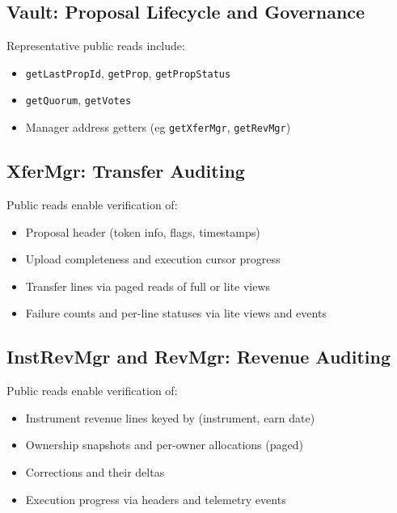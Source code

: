 \documentclass[10pt]{article}
\begin{document}
\subsection{Vault: Proposal Lifecycle and Governance}
Representative public reads include:

\begin{itemize}
    \item \texttt{getLastPropId}, \texttt{getProp}, \texttt{getPropStatus}
    \item \texttt{getQuorum}, \texttt{getVotes}
    \item Manager address getters (eg \texttt{getXferMgr}, \texttt{getRevMgr})
\end{itemize}

\subsection{XferMgr: Transfer Auditing}
Public reads enable verification of:

\begin{itemize}
    \item Proposal header (token info, flags, timestamps)
    \item Upload completeness and execution cursor progress
    \item Transfer lines via paged reads of full or lite views
    \item Failure counts and per-line statuses via lite views and events
\end{itemize}

\subsection{InstRevMgr and RevMgr: Revenue Auditing}
Public reads enable verification of:

\begin{itemize}
    \item Instrument revenue lines keyed by (instrument, earn date)
    \item Ownership snapshots and per-owner allocations (paged)
    \item Corrections and their deltas
    \item Execution progress via headers and telemetry events
\end{itemize}

\end{document}
